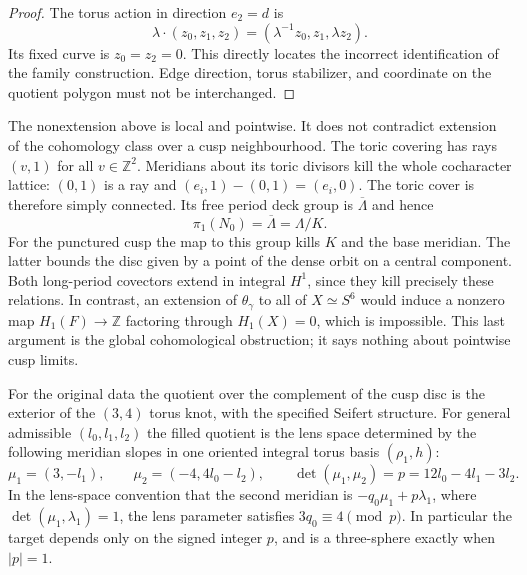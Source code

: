 \begin{proof}
The torus action in direction $e_2=d$ is
\[
 \lambda\cdot(z_0,z_1,z_2)
       =(\lambda^{-1}z_0,z_1,\lambda z_2).
\]
Its fixed curve is $z_0=z_2=0$.  This directly locates the
incorrect identification of the family construction.  Edge direction,
torus stabilizer, and coordinate on the quotient polygon must
not be interchanged.
\end{proof}

The nonextension above is local and pointwise.  It does not
contradict extension of the cohomology class over a cusp
neighbourhood.  The toric covering has rays $(v,1)$ for all
$v\in\mathbb Z^2$.  Meridians about its toric divisors kill
the whole cocharacter lattice: $(0,1)$ is a ray and
$(e_i,1)-(0,1)=(e_i,0)$.  The toric cover is therefore simply
connected.  Its free period deck group is $\overline\Lambda$
and hence
\[
 \pi_1(N_0)=\overline\Lambda=\Lambda/K.
 \label{mapsI:quotient-eq-5}
\]
For the punctured cusp the map to this group kills $K$ and
the base meridian.  The latter bounds the disc given by a
point of the dense orbit on a central component.  Both
long-period covectors extend in integral $H^1$, since they
kill precisely these relations.  In contrast, an extension
of $\theta_\gamma$ to all of $X\simeq S^6$ would induce a
nonzero map $H_1(F)\to\mathbb Z$ factoring through
$H_1(X)=0$, which is impossible.  This last argument is the
global cohomological obstruction; it says nothing about
pointwise cusp limits.

\begin{proposition}\label{mapsI:src:A.1.3}
For the original data the quotient over the complement of
the cusp disc is the exterior of the $(3,4)$ torus knot,
with the specified Seifert structure.  For general admissible
$(l_0,l_1,l_2)$ the filled quotient is the lens space determined
by the following meridian slopes in one oriented integral
torus basis $(\rho_1,h)$:
\[
 \mu_1=(3,-l_1),\qquad
 \mu_2=(-4,4l_0-l_2),\qquad
 \det(\mu_1,\mu_2)=p=12l_0-4l_1-3l_2.
 \label{mapsI:quotient-eq-6}
\]
In the lens-space convention that the second meridian is
$-q_0\mu_1+p\lambda_1$, where
$\det(\mu_1,\lambda_1)=1$, the lens parameter satisfies
$3q_0\equiv4\pmod p$.  In particular the target depends only
on the signed integer $p$, and is a three-sphere exactly
when $|p|=1$.
\end{proposition}

